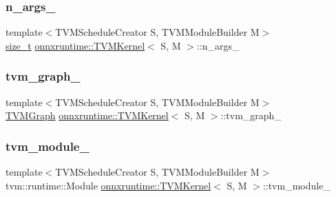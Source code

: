 \subsubsection{\texorpdfstring{n\+\_\+args\+\_\+}{n\_args\_}}
{\footnotesize\ttfamily template$<$T\+V\+M\+Schedule\+Creator S, T\+V\+M\+Module\+Builder M$>$ \\
\mbox{\hyperlink{mlasi_8h_a503efbc1c6e50825320ad909366b78ab}{size\+\_\+t}} \mbox{\hyperlink{classonnxruntime_1_1TVMKernel}{onnxruntime\+::\+T\+V\+M\+Kernel}}$<$ S, M $>$\+::n\+\_\+args\+\_\+\hspace{0.3cm}{\ttfamily [protected]}}

\mbox{\label{classonnxruntime_1_1TVMKernel_a40d27f1775a22e11a68c1d8f87647f64}} 
\subsubsection{\texorpdfstring{tvm\+\_\+graph\+\_\+}{tvm\_graph\_}}
{\footnotesize\ttfamily template$<$T\+V\+M\+Schedule\+Creator S, T\+V\+M\+Module\+Builder M$>$ \\
\mbox{\hyperlink{structonnxruntime_1_1TVMGraph}{T\+V\+M\+Graph}} \mbox{\hyperlink{classonnxruntime_1_1TVMKernel}{onnxruntime\+::\+T\+V\+M\+Kernel}}$<$ S, M $>$\+::tvm\+\_\+graph\+\_\+\hspace{0.3cm}{\ttfamily [protected]}}

\mbox{\label{classonnxruntime_1_1TVMKernel_a5ac8938f6df7ff5b4d2945c531cdfbef}} 
\subsubsection{\texorpdfstring{tvm\+\_\+module\+\_\+}{tvm\_module\_}}
{\footnotesize\ttfamily template$<$T\+V\+M\+Schedule\+Creator S, T\+V\+M\+Module\+Builder M$>$ \\
tvm\+::runtime\+::\+Module \mbox{\hyperlink{classonnxruntime_1_1TVMKernel}{onnxruntime\+::\+T\+V\+M\+Kernel}}$<$ S, M $>$\+::tvm\+\_\+module\+\_\+\hspace{0.3cm}{\ttfamily [protected]}}

